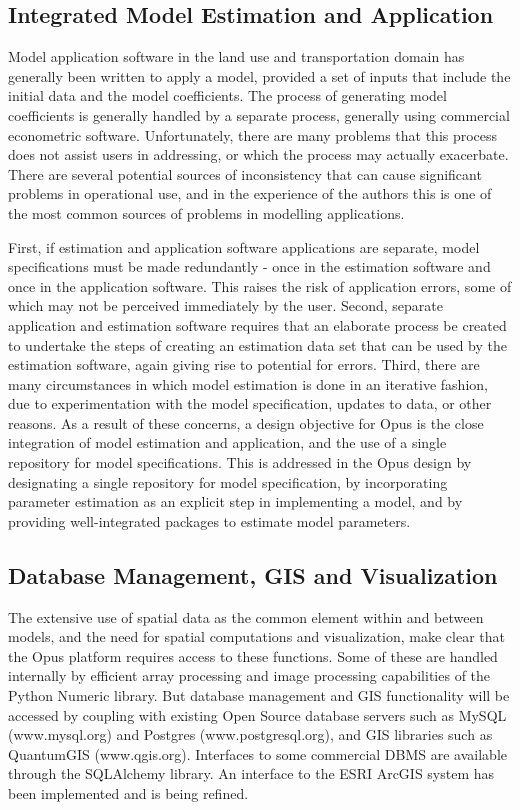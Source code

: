 \subsection{Integrated Model Estimation and Application}
Model application software in the land use and transportation domain has generally been written to apply a model, provided a set of inputs that include the initial data and the model coefficients. The process of generating model coefficients is generally handled by a separate process, generally using commercial econometric software. Unfortunately, there are many problems that this process does not assist users in addressing, or which the process may actually exacerbate. There are several potential sources of inconsistency that can cause significant problems in operational use, and in the experience of the authors this is one of the most common sources of problems in modelling applications.  

First, if estimation and application software applications are separate, model specifications must be made redundantly - once in the estimation software and once in the application software.  This raises the risk of application errors, some of which may not be perceived immediately by the user. Second, separate application and estimation software requires that an elaborate process be created to undertake the steps of creating an estimation data set that can be used by the estimation software, again giving rise to potential for errors. Third, there are many circumstances in which model estimation is done in an iterative fashion, due to experimentation with the model specification, updates to data, or other reasons.  As a result of these concerns, a design objective for Opus is the close integration of model estimation and application, and the use of a single repository for model specifications.  This is addressed in the Opus design by designating a single repository for model specification, by incorporating parameter estimation as an explicit step in implementing a model, and by providing well-integrated packages to estimate model parameters.

\subsection{Database Management, GIS and Visualization}
The extensive use of spatial data as the common element within and between models, and the need for spatial computations and visualization, make clear that the Opus platform requires access to these functions.  Some of these are handled internally by efficient array processing and image processing capabilities of the Python Numeric library.  But database management and GIS functionality will be accessed by coupling with existing Open Source database servers such as MySQL (www.mysql.org) and Postgres (www.postgresql.org), and GIS libraries such as QuantumGIS (www.qgis.org).  Interfaces to some commercial DBMS are available through the SQLAlchemy library. An interface to the ESRI ArcGIS system has been implemented and is being refined.

